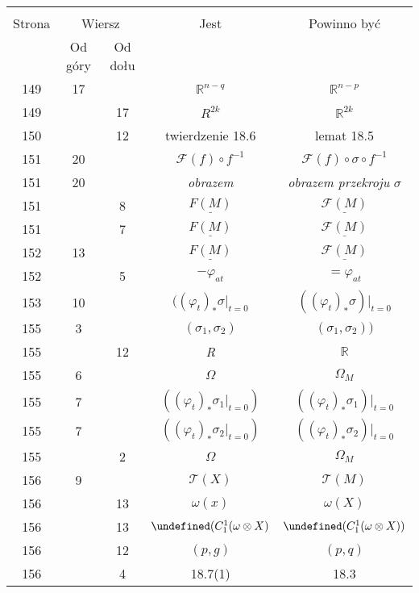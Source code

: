 \documentclass[a4paper,11pt]{article}
\newcommand{\mb}{\mathbb}
\newcommand{\mc}{\mathcal}
\newcommand{\ul}{\underline}
\newcommand{\ot}{\otimes}
\newcommand{\vp}{\varphi}
\newcommand{\om}{\omega}
\newcommand{\Om}{\Omega}
\newcommand{\s}{\sigma}
\newcommand{\R}{\mb{R}}
\newcommand{\F}{\mc{F}}
\let\L\undefined
\newcommand{\L}{\mc{L}}
\newcommand{\T}{\mc{T}}
\begin{document}
\begin{center}
  \begin{tabular}{|c|c|c|c|c|}
    \hline
    & \multicolumn{2}{c|}{} & & \\
    Strona & \multicolumn{2}{c|}{Wiersz} & Jest
                              & Powinno być \\ \cline{2-3}
    & Od góry & Od dołu &  &  \\
    \hline
    149 & 17 & & $\R^{ n - q }$ & $\R^{ n - p }$ \\
    149 & & 17 & $R^{ 2k }$ & $\R^{ 2k }$ \\
    150 & & 12 & twierdzenie 18.6 & lemat 18.5 \\
    151 & 20 & & $\F( f ) \circ f^{ -1 }$ & $\F( f ) \circ \s
                                            \circ f^{ -1 }$ \\
    151 & 20 & & \emph{obrazem} & \emph{obrazem przekroju} $\s$ \\
    151 & &  8 & $\ul{ F( M ) }$ & $\ul{ \F( M ) }$ \\
    151 & &  7 & $\ul{ F( M ) }$ & $\ul{ \F( M ) }$ \\
    152 & 13 & & $\ul{ F( M ) }$ & $\ul{ \F( M ) }$ \\
    152 & &  5 & $-\vp_{ a t }$ & $= \vp_{ a t }$ \\
    153 & 10 & & $( ( \vp_{ t } )_{ * } \s \bigg|_{ t = 0 }$
           & $( ( \vp_{ t } )_{ * } \s )\bigg|_{ t = 0 }$ \\
    155 &  3 & & $( \s_{ 1 }, \s_{ 2 } )$ & $( \s_{ 1 }, \s_{ 2 } ) )$ \\
    155 & & 12 & \emph{R} & \emph{$\R$} \\
    155 &  6 & & $\Om$ & $\Om_{ M }$ \\
    155 &  7 & & $( ( \vp_{ t } )_{ * } \s_{ 1 } \bigg|_{ t = 0 } )$
           & $( ( \vp_{ t } )_{ * } \s_{ 1 } )\bigg|_{ t = 0 }$ \\
    155 &  7 & & $( ( \vp_{ t } )_{ * } \s_{ 2 } \bigg|_{ t = 0 } )$
           & $( ( \vp_{ t } )_{ * } \s_{ 2 } )\bigg|_{ t = 0 }$ \\
    155 & &  2 & $\Om$ & $\Om_{ M }$ \\
    156 &  9 & & $\T( X )$ & $\T( M )$ \\
    156 & & 13 & $\om( x )$ & $\om( X )$ \\
    156 & & 13 & $\L( C^{ 1 }_{ 1 }( \om \ot X )$
           & $\L( C^{ 1 }_{ 1 }( \om \ot X ) )$ \\
    156 & & 12 & $( p, g )$ & $( p, q )$ \\
    156 & &  4 & 18.7(1) & 18.3 \\

\end{tabular}
\end{center}
\end{document}

